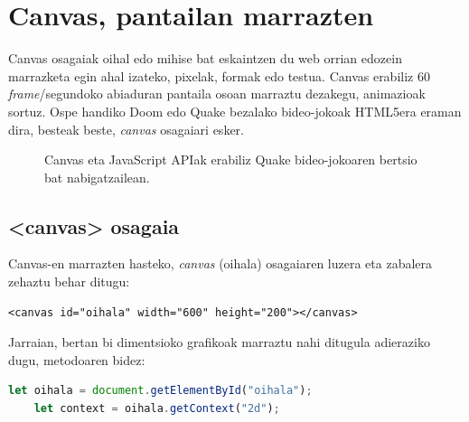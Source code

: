 \chapter{Canvas, pantailan marrazten}
Canvas osagaiak oihal edo mihise bat eskaintzen du web orrian edozein marrazketa egin ahal izateko, pixelak, formak edo testua. Canvas erabiliz 60 \textit{frame}/segundoko abiaduran pantaila osoan marraztu dezakegu, animazioak sortuz. Ospe handiko Doom edo Quake bezalako bideo-jokoak HTML5era eraman dira, besteak beste, \textit{canvas} osagaiari esker. 


\begin{figure}[ht]
	\centering
{}
\caption{Canvas eta JavaScript APIak erabiliz Quake bideo-jokoaren bertsio bat nabigatzailean.}
\label{fig:quakejs}
\end{figure}



\section{<canvas> osagaia}
Canvas-en marrazten hasteko, \textit{canvas} (oihala) osagaiaren luzera eta zabalera zehaztu behar ditugu:
\begin{verbatim}
<canvas id="oihala" width="600" height="200"></canvas>    
\end{verbatim}

Jarraian, bertan bi dimentsioko grafikoak marraztu nahi ditugula adieraziko dugu,   metodoaren bidez:
\begin{lstlisting}[language=JavaScript,numbers=none]
    let oihala = document.getElementById("oihala");
    let context = oihala.getContext("2d");
\end{lstlisting}

